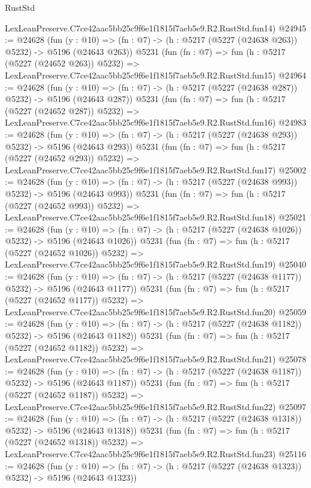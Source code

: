 \begin{lexlean}{RustStd}
\begin{coremodule}
    LexLeanPreserve.C7ce42aac5bb25c9f6e1f1815f7aeb5e9.R2.RustStd.fun14)
@24945 := @24628
    (fun (y : @10) => (fn : @7) -> (h : @5217 (@5227 (@24638 @263)) @5232) -> @5196 (@24643 @263))
    @5231
    (fun (fn : @7) =>
    fun (h : @5217 (@5227 (@24652 @263)) @5232) =>
    LexLeanPreserve.C7ce42aac5bb25c9f6e1f1815f7aeb5e9.R2.RustStd.fun15)
@24964 := @24628
    (fun (y : @10) => (fn : @7) -> (h : @5217 (@5227 (@24638 @287)) @5232) -> @5196 (@24643 @287))
    @5231
    (fun (fn : @7) =>
    fun (h : @5217 (@5227 (@24652 @287)) @5232) =>
    LexLeanPreserve.C7ce42aac5bb25c9f6e1f1815f7aeb5e9.R2.RustStd.fun16)
@24983 := @24628
    (fun (y : @10) => (fn : @7) -> (h : @5217 (@5227 (@24638 @293)) @5232) -> @5196 (@24643 @293))
    @5231
    (fun (fn : @7) =>
    fun (h : @5217 (@5227 (@24652 @293)) @5232) =>
    LexLeanPreserve.C7ce42aac5bb25c9f6e1f1815f7aeb5e9.R2.RustStd.fun17)
@25002 := @24628
    (fun (y : @10) => (fn : @7) -> (h : @5217 (@5227 (@24638 @993)) @5232) -> @5196 (@24643 @993))
    @5231
    (fun (fn : @7) =>
    fun (h : @5217 (@5227 (@24652 @993)) @5232) =>
    LexLeanPreserve.C7ce42aac5bb25c9f6e1f1815f7aeb5e9.R2.RustStd.fun18)
@25021 := @24628
    (fun (y : @10) => (fn : @7) -> (h : @5217 (@5227 (@24638 @1026)) @5232) -> @5196 (@24643 @1026))
    @5231
    (fun (fn : @7) =>
    fun (h : @5217 (@5227 (@24652 @1026)) @5232) =>
    LexLeanPreserve.C7ce42aac5bb25c9f6e1f1815f7aeb5e9.R2.RustStd.fun19)
@25040 := @24628
    (fun (y : @10) => (fn : @7) -> (h : @5217 (@5227 (@24638 @1177)) @5232) -> @5196 (@24643 @1177))
    @5231
    (fun (fn : @7) =>
    fun (h : @5217 (@5227 (@24652 @1177)) @5232) =>
    LexLeanPreserve.C7ce42aac5bb25c9f6e1f1815f7aeb5e9.R2.RustStd.fun20)
@25059 := @24628
    (fun (y : @10) => (fn : @7) -> (h : @5217 (@5227 (@24638 @1182)) @5232) -> @5196 (@24643 @1182))
    @5231
    (fun (fn : @7) =>
    fun (h : @5217 (@5227 (@24652 @1182)) @5232) =>
    LexLeanPreserve.C7ce42aac5bb25c9f6e1f1815f7aeb5e9.R2.RustStd.fun21)
@25078 := @24628
    (fun (y : @10) => (fn : @7) -> (h : @5217 (@5227 (@24638 @1187)) @5232) -> @5196 (@24643 @1187))
    @5231
    (fun (fn : @7) =>
    fun (h : @5217 (@5227 (@24652 @1187)) @5232) =>
    LexLeanPreserve.C7ce42aac5bb25c9f6e1f1815f7aeb5e9.R2.RustStd.fun22)
@25097 := @24628
    (fun (y : @10) => (fn : @7) -> (h : @5217 (@5227 (@24638 @1318)) @5232) -> @5196 (@24643 @1318))
    @5231
    (fun (fn : @7) =>
    fun (h : @5217 (@5227 (@24652 @1318)) @5232) =>
    LexLeanPreserve.C7ce42aac5bb25c9f6e1f1815f7aeb5e9.R2.RustStd.fun23)
@25116 := @24628
    (fun (y : @10) => (fn : @7) -> (h : @5217 (@5227 (@24638 @1323)) @5232) -> @5196 (@24643 @1323))

\end{coremodule}
\end{lexlean}
